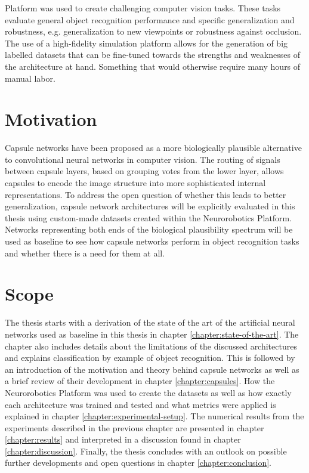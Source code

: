 Platform was used to create challenging computer vision tasks. These tasks evaluate general object recognition performance and specific generalization and robustness, e.g. generalization to new viewpoints or robustness against occlusion. The use of a high-fidelity simulation platform allows for the generation of big labelled datasets that can be fine-tuned towards the strengths and weaknesses of the architecture at hand. Something that would otherwise require many hours of manual labor.
\section{Motivation}
Capsule networks have been proposed as a more biologically plausible alternative to convolutional neural networks in computer vision. The routing of signals between capsule layers, based on grouping votes from the lower layer, allows capsules to encode the image structure into more sophisticated internal representations. To address the open question of whether this leads to better generalization, capsule network architectures will be explicitly evaluated in this thesis using custom-made datasets created within the Neurorobotics Platform. Networks representing both ends of the biological plausibility spectrum will be used as baseline to see how capsule networks perform in object recognition tasks and whether there is a need for them at all.
\section{Scope}
The thesis starts with a derivation of the state of the art of the artificial neural networks used as baseline in this thesis in chapter \ref{chapter:state-of-the-art}. The chapter also includes details about the limitations of the discussed architectures and explains classification by example of object recognition. This is followed by an introduction of the motivation and theory behind capsule networks as well as a brief review of their development in chapter \ref{chapter:capsules}. How the Neurorobotics Platform was used to create the datasets as well as how exactly each architecture was trained and tested and what metrics were applied is explained in chapter \ref{chapter:experimental-setup}. The numerical results from the experiments described in the previous chapter are presented in chapter \ref{chapter:results} and interpreted in a discussion found in chapter \ref{chapter:discussion}. Finally, the thesis concludes with an outlook on possible further developments and open questions in chapter \ref{chapter:conclusion}.

